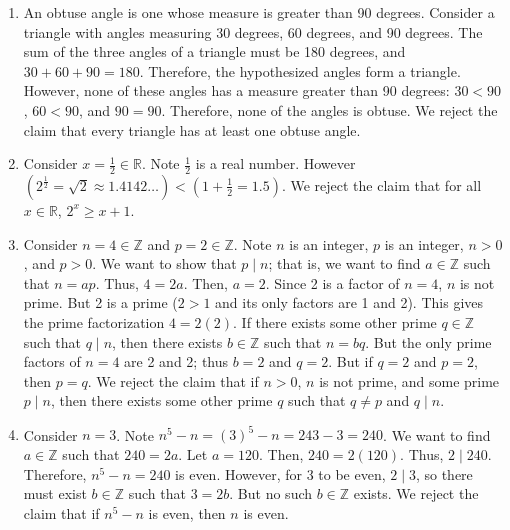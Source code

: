 \documentclass{article}
\theoremstyle{definition}
\begin{document}
\begin{solution}\begin{enumerate}
\item An obtuse angle is one whose measure is greater than 90 degrees. Consider a triangle with angles measuring 30 degrees, 60 degrees, and 90 degrees. The sum of the three angles of a triangle must be 180 degrees, and $30+60+90=180$. Therefore, the hypothesized angles form a triangle. However, none of these angles has a measure greater than 90 degrees: $30<90$, $60<90$, and $90=90$. Therefore, none of the angles is obtuse. We reject the claim that every triangle has at least one obtuse angle.
\item Consider $x=\frac{1}{2}\in\mathbb{R}$. Note $\frac{1}{2}$ is a real number. However $\left(2^{\frac{1}{2}}=\sqrt{2}\approx 1.4142\dots\right)<\left(1+\frac{1}{2}=1.5\right)$. We reject the claim that for all $x\in\mathbb{R}$, $2^x\geq x+1$.
\item Consider $n=4\in\mathbb{Z}$ and $p=2\in\mathbb{Z}$. Note $n$ is an integer, $p$ is an integer, $n>0$, and $p>0$. We want to show that $p \mid n$; that is, we want to find $a\in\mathbb{Z}$ such that $n=ap$. Thus, $4=2a$. Then, $a=2$. Since 2 is a factor of $n=4$, $n$ is not prime. But 2 is a prime ($2>1$ and its only factors are 1 and 2). This gives the prime factorization $4=2(2)$. If there exists some other prime $q\in\mathbb{Z}$ such that $q \mid n$, then there exists $b\in\mathbb{Z}$ such that $n=bq$. But the only prime factors of $n=4$ are 2 and 2; thus $b=2$ and $q=2$. But if $q=2$ and $p=2$, then $p=q$. We reject the claim that if $n>0$, $n$ is not prime, and some prime $p \mid n$, then there exists some other prime $q$ such that $q\neq p$ and $q \mid n$.

\item Consider $n=3$. Note $n^5-n=(3)^5-n=243-3=240$. We want to find $a\in\mathbb{Z}$ such that $240=2a$. Let $a=120$. Then, $240=2(120)$. Thus, $2 \mid 240$. Therefore, $n^5-n=240$ is even. However, for 3 to be even, $2 \mid 3$, so there must exist $b\in\mathbb{Z}$ such that $3=2b$. But no such $b\in\mathbb{Z}$ exists. We reject the claim that if $n^5-n$ is even, then $n$ is even.
\end{enumerate}
\end{solution}
\end{document}
